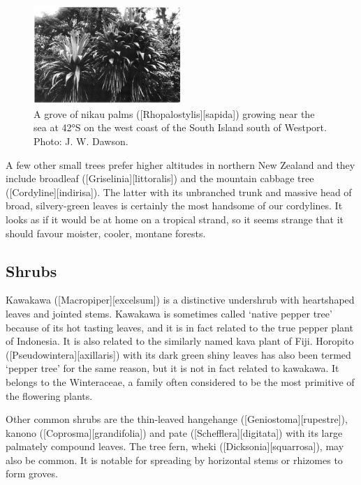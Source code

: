 \begin{figure}
	\includegraphics[width=0.5\textwidth]{graphics/figure61cabbagetree.jpg}
	\centering
	\caption[A grove of nikau palms]{A grove of nikau palms ([Rhopalostylis][sapida]) growing near the sea at \ang{42}S on the west coast of the South Island south of Westport. Photo:  J. W. Dawson.}%
	\label{fig:61cabbagetree}
\end{figure}

A few other small trees prefer higher altitudes in northern New Zealand and they include broadleaf ([Griselinia][littoralis]) and the mountain cabbage tree ([Cordyline][indirisa]).
The latter with its unbranched trunk and massive head of broad, silvery-green leaves is certainly the most handsome of our cordylines.
It looks as if it would be at home on a tropical strand, so it seems strange that it should favour moister, cooler, montane forests.

\subsection{Shrubs}

Kawakawa ([Macropiper][excelsum]) is a distinctive undershrub with heartshaped leaves and jointed stems.
Kawakawa is sometimes called `native pepper tree' because of its hot tasting leaves, and it is in fact related to the true pepper plant of Indonesia.
It is also related to the similarly named kava plant of Fiji.
Horopito ([Pseudowintera][axillaris]) with its dark green shiny leaves has also been termed `pepper tree' for the same reason, but it is not in fact related to kawakawa.
It belongs to the Winteraceae, a family often considered to be the most primitive of the flowering plants.

Other common shrubs are the thin-leaved hangehange ([Geniostoma][rupestre]), kanono ([Coprosma][grandifolia]) and pate ([Schefflera][digitata]) with its large palmately compound leaves.
The tree fern, wheki ([Dicksonia][squarrosa]), may also be common.
It is notable for spreading by horizontal stems or rhizomes to form groves.

